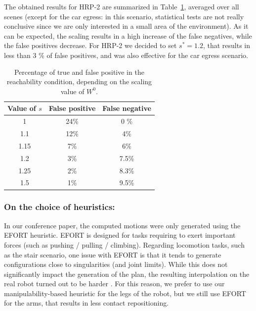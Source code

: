The obtained results for HRP-2 are summarized in Table~\ref{tab:scale}, averaged over all scenes (except for the car egress: in this scenario, 
statistical tests are not really conclusive since we are only interested in a small area of the environment).
As it can be expected, the scaling results in a high increase of the false negatives, while the false positives decrease.
For HRP-2 we decided to set $s^*=1.2$, that results in less than 3 \% of false positives, and was also effective
for the car egress scenario. 

\begin{table}
\centering
\footnotesize
\begin{tabular}{c | c | c}
   Value of $s$ &  False positive & False negative\\
 \hline
   1   & 24\% & 0 \%\\
   1.1& 12\% & 4\% \\
   1.15& 7\% & 6\%\\
   1.2 & 3\% & 7.5\%\\
   1.25& 2\% & 8.3\%\\
   1.5 & 1\% & 9.5\%\\
 \end{tabular}
\caption{Percentage of true and false positive in the reachability condition, depending on the scaling value of $W^0$.}
\label{tab:scale}
\quad
\end{table}

\subsubsection{On the choice of heuristics:} \label{sec:heuristichoices}
In our conference paper, the computed motions were only generated using the EFORT heuristic.
EFORT is designed for tasks requiring to exert important forces (such as pushing / pulling / climbing). 
Regarding locomotion tasks, such as the stair scenario, one issue with EFORT is that it tends to generate
configurations close to singularities (and joint limits). While this does not significantly impact
the generation of the plan, the resulting interpolation on the real robot turned out to be harder \citep{Carpentier2016}.
For this reason, we prefer to use our manipulability-based heuristic for the legs of the robot, but we still
use EFORT for the arms, that results in less contact repositioning.

